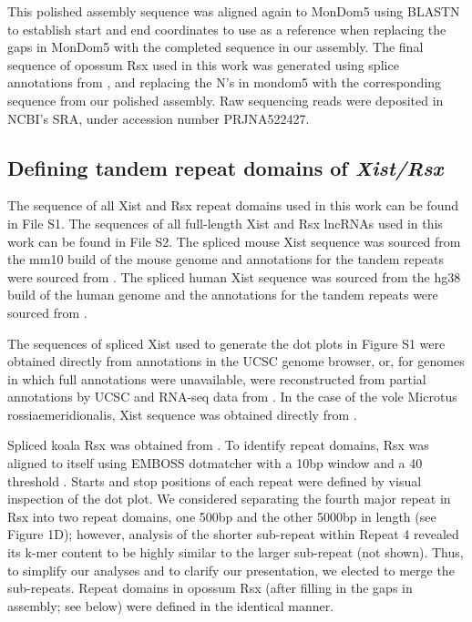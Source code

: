 This polished assembly sequence was aligned again to MonDom5 using BLASTN to establish start and end coordinates to use as a reference when replacing the gaps in MonDom5 with the completed sequence in our assembly. The final sequence of opossum Rsx used in this work was generated using splice annotations from \cite{Grant2012RsxInactivation}, and replacing the N’s in mondom5 with the corresponding sequence from our polished assembly. Raw sequencing reads were deposited in NCBI’s SRA, under accession number PRJNA522427.

\subsection{Defining tandem repeat domains of \emph{Xist/Rsx}}
The sequence of all Xist and Rsx repeat domains used in this work can be found in File S1. The sequences of all full-length Xist and Rsx lncRNAs used in this work can be found in File S2. The spliced mouse Xist sequence was sourced from the mm10 build of the mouse genome and annotations for the tandem repeats were sourced from \cite{Brockdorff10TheNucleus.}. The spliced human Xist sequence was sourced from the hg38 build of the human genome and the annotations for the tandem repeats were sourced from \cite{Brown10TheNucleus.,Yen2007AEutheria}. 

The sequences of spliced Xist used to generate the dot plots in Figure S1 were obtained directly from annotations in the UCSC genome browser, or, for genomes in which full annotations were unavailable, were reconstructed from partial annotations by UCSC and RNA-seq data from \cite{Hezroni2015PrinciplesSpecies}. In the case of the vole Microtus rossiaemeridionalis, Xist sequence was obtained directly from \cite{Nesterova2001CharacterizationSequence}.

Spliced koala Rsx was obtained from \cite{Johnson2018AdaptationGenome}. To identify repeat domains, Rsx was aligned to itself using EMBOSS dotmatcher with a 10bp window and a 40 threshold \cite{Rice2000EMBOSS:Suite}. Starts and stop positions of each repeat were defined by visual inspection of the dot plot. We considered separating the fourth major repeat in Rsx into two repeat domains, one 500bp and the other 5000bp in length (see Figure 1D); however, analysis of the shorter sub-repeat within Repeat 4 revealed its k-mer content to be highly similar to the larger sub-repeat (not shown). Thus, to simplify our analyses and to clarify our presentation, we elected to merge the sub-repeats. Repeat domains in opossum Rsx (after filling in the gaps in assembly; see below) were defined in the identical manner.

